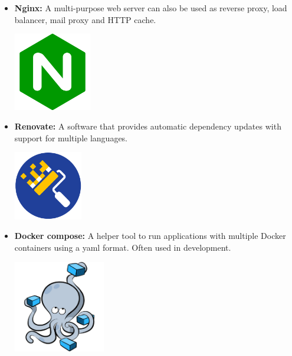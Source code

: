 \begin{itemize}
          \newpage
    \item \textbf{Nginx:} \newline \cite{nginx} A multi-purpose web server can also be used as reverse proxy, load balancer, mail proxy and HTTP cache. \newline \newline
          \begin{minipage}{\linewidth}
              \centering
              \includegraphics[width=3.4cm]{src/assets/logos/nginx_512x512.png}
          \end{minipage}
    \item \textbf{Renovate:} \newline A software that provides automatic dependency updates with support for multiple languages. \newline
          \begin{minipage}{\linewidth}
              \centering
              \includegraphics[width=3cm]{src/assets/logos/renovate_200x200.png}
          \end{minipage}
    \item \textbf{Docker compose:} \newline A helper tool to run applications with multiple Docker containers using a yaml format. Often used in development. \newline \newline
          \begin{minipage}{\linewidth}
              \centering
              \includegraphics[width=4cm]{src/assets/logos/docker-compose_667x667.png}
          \end{minipage}


\end{itemize}
